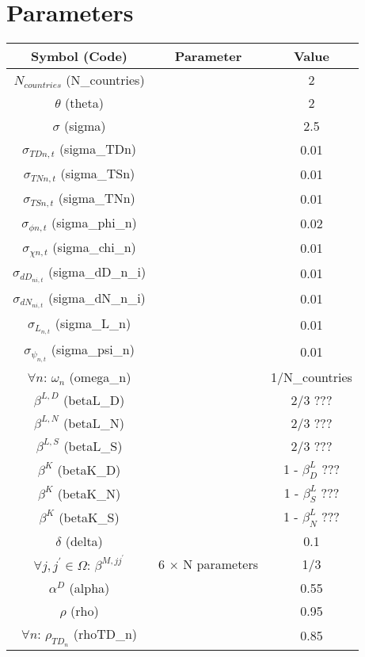 \documentclass[12pt, bibtotoc, tablecaptionabove, figurecaptionabove, fleqn]{article}
\begin{document}
{\section{Parameters}
{\small
\begin{center}
	\begin{tabular}{ccc} 
		\hline
		\hline
		Symbol (Code) & Parameter & Value \\ 
		\hline
		$N_{countries}$ (N\_{countries}) & & 2 \\ 		
		$\theta$ (theta) & & 2 \\ 
		$\sigma$ (sigma) & & 2.5 \\
		$\sigma_{TDn,t}$ (sigma\_TDn) & & 0.01 \\
		$\sigma_{TNn,t}$ (sigma\_TSn) & & 0.01 \\
		$\sigma_{TSn,t}$ (sigma\_TNn) & & 0.01 \\
		$\sigma_{\phi n,t}$ (sigma\_phi\_n) & & 0.02 \\				$\sigma_{\chi n,t}$ (sigma\_chi\_n) & & 0.01 \\
                $\sigma_{dD_{ni,t}}$ (sigma\_dD\_n\_i) & & 0.01 \\
                $\sigma_{dN_{ni,t}}$ (sigma\_dN\_n\_i) & & 0.01 \\                
                $\sigma_{L_{n,t}}$ (sigma\_L\_n) & & 0.01 \\
                $\sigma_{\psi_{n,t}}$ (sigma\_psi\_n) & & 0.01 \\		                
		$\forall n$: $\omega_n$ (omega\_n) & & 1/N\_{countries}\\
		$\beta^{L,D}$ (betaL\_D) & & 2/3 ??? \\
                $\beta^{L,N}$ (betaL\_N) & & 2/3 ???\\
                $\beta^{L,S}$ (betaL\_S) & & 2/3 ??? \\                
		$\beta^K$ (betaK\_D) & & 1 - $\beta^L_D$ ???\\
		$\beta^K$ (betaK\_N) & & 1 - $\beta^L_S$ ???\\
		$\beta^K$ (betaK\_S) & & 1 - $\beta^L_N$ ???\\		
		$\delta$ (delta) & & 0.1 \\
		$\forall j, j^{\prime} \in \Omega$: $\beta^{M, j j^{\prime}}$ & 6 $\times$ N parameters & 1/3\\
 		$\alpha^D$ (alpha) & & 0.55 \\ 
		$\rho$ (rho) & & 0.95 \\ 
		$\forall n$: $\rho_{TD_n}$ (rhoTD\_n) & & 0.85 \\ 

\end{tabular}
\end{center}}}
\end{document}
